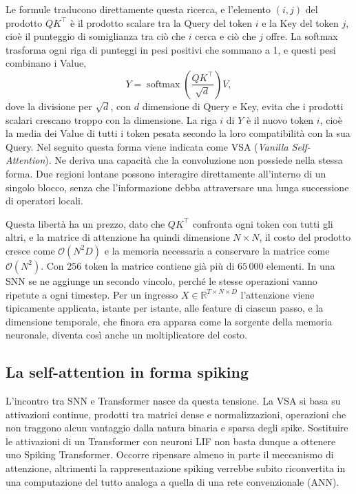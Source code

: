 Le formule traducono direttamente questa ricerca, e l'elemento $(i,j)$ del prodotto $QK^{\top}$ è il prodotto scalare tra la Query del token $i$ e la Key del token $j$, cioè il punteggio di somiglianza tra ciò che $i$ cerca e ciò che $j$ offre. La softmax trasforma ogni riga di punteggi in pesi positivi che sommano a 1, e questi pesi combinano i Value,
\begin{equation}
\label{eq:vanilla_softmax_attention}
Y = \operatorname{softmax}\left( \frac{Q K^{\top}}{\sqrt{d}} \right) V,
\end{equation}
dove la divisione per $\sqrt{d}$, con $d$ dimensione di Query e Key, evita che i prodotti scalari crescano troppo con la dimensione. La riga $i$ di $Y$ è il nuovo token $i$, cioè la media dei Value di tutti i token pesata secondo la loro compatibilità con la sua Query. Nel seguito questa forma viene indicata come VSA (\emph{Vanilla Self-Attention}). Ne deriva una capacità che la convoluzione non possiede nella stessa forma. Due regioni lontane possono interagire direttamente all'interno di un singolo blocco, senza che l'informazione debba attraversare una lunga successione di operatori locali.

Questa libertà ha un prezzo, dato che $QK^{\top}$ confronta ogni token con tutti gli altri, e la matrice di attenzione ha quindi dimensione $N\times N$, il costo del prodotto cresce come $\mathcal{O}(N^2D)$ e la memoria necessaria a conservare la matrice come $\mathcal{O}(N^2)$. Con 256 token la matrice contiene già più di $65\,000$ elementi. In una SNN se ne aggiunge un secondo vincolo, perché le stesse operazioni vanno ripetute a ogni timestep. Per un ingresso $X\in\mathbb{R}^{T\times N\times D}$ l'attenzione viene tipicamente applicata, istante per istante, alle feature di ciascun passo, e la dimensione temporale, che finora era apparsa come la sorgente della memoria neuronale, diventa così anche un moltiplicatore del costo.

\subsection{La self-attention in forma spiking}
\label{subsec:ssa}

L'incontro tra SNN e Transformer nasce da questa tensione. La VSA si basa su attivazioni continue, prodotti tra matrici dense e normalizzazioni, operazioni che non traggono alcun vantaggio dalla natura binaria e sparsa degli spike. Sostituire le attivazioni di un Transformer con neuroni LIF non basta dunque a ottenere uno Spiking Transformer. Occorre ripensare almeno in parte il meccanismo di attenzione, altrimenti la rappresentazione spiking verrebbe subito riconvertita in una computazione del tutto analoga a quella di una rete convenzionale (ANN).

